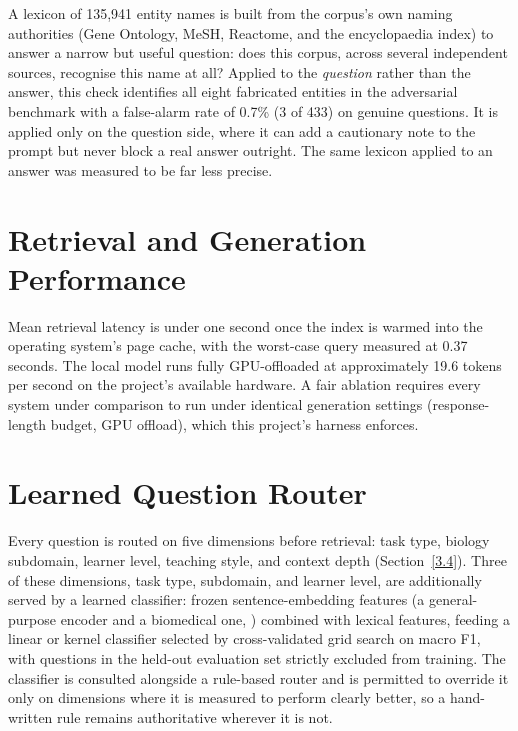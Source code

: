 A lexicon of 135{,}941 entity names is built from the corpus's own naming
authorities (Gene Ontology, MeSH, Reactome, and the encyclopaedia index)
to answer a narrow but useful question: does this corpus, across several
independent sources, recognise this name at all? Applied to the
\emph{question} rather than the answer, this check identifies all eight
fabricated entities in the adversarial benchmark with a false-alarm rate
of 0.7\% (3 of 433) on genuine questions. It is applied only on the
question side, where it can add a cautionary note to the prompt but never
block a real answer outright. The same lexicon applied to an answer was
measured to be far less precise.

\section{Retrieval and Generation Performance}\label{4.9}

Mean retrieval latency is under one second once the index is warmed into
the operating system's page cache, with the worst-case query measured at
0.37 seconds. The local model runs fully GPU-offloaded at approximately
19.6 tokens per second on the project's available hardware. A fair
ablation requires every system under comparison to run under identical
generation settings (response-length budget, GPU offload), which this
project's harness enforces.

\section{Learned Question Router}\label{4.10}

Every question is routed on five dimensions before retrieval: task type,
biology subdomain, learner level, teaching style, and context depth
(Section~\ref{3.4}). Three of these dimensions, task type, subdomain, and
learner level, are additionally served by a learned classifier: frozen
sentence-embedding features (a general-purpose encoder and a biomedical
one, \cite{xiao2023bge,liu2021sapbert}) combined with lexical features,
feeding a linear or kernel classifier selected by cross-validated grid
search on macro F1, with questions in the held-out evaluation set strictly
excluded from training. The classifier is consulted alongside a
rule-based router and is permitted to override it only on dimensions
where it is measured to perform clearly better, so a hand-written rule
remains authoritative wherever it is not.


